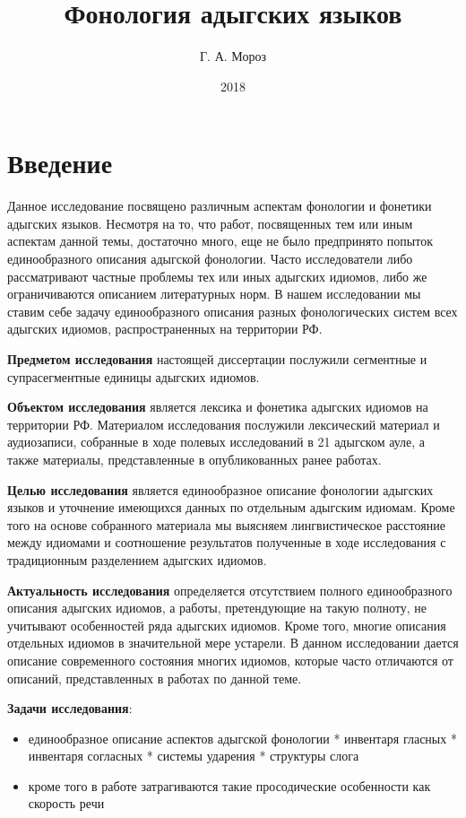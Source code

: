 \documentclass[russian,]{book}
\title{Фонология адыгских языков}
\author{Г. А. Мороз}
\date{2018}
\providecommand{\tightlist}{%
  \setlength{\itemsep}{0pt}\setlength{\parskip}{0pt}}
\begin{document}
\maketitle

{
\setcounter{tocdepth}{1}
\tableofcontents
}
\chapter{Введение}\label{intro}

Данное исследование посвящено различным аспектам фонологии и фонетики
адыгских языков. Несмотря на то, что работ, посвященных тем или иным
аспектам данной темы, достаточно много, еще не было предпринято попыток
единообразного описания адыгской фонологии. Часто исследователи либо
рассматривают частные проблемы тех или иных адыгских идиомов, либо же
ограничиваются описанием литературных норм. В нашем исследовании мы
ставим себе задачу единообразного описания разных фонологических систем
всех адыгских идиомов, распространенных на территории РФ.

\textbf{Предметом исследования} настоящей диссертации послужили
сегментные и супрасегментные единицы адыгских идиомов.

\textbf{Объектом исследования} является лексика и фонетика адыгских
идиомов на территории РФ. Материалом исследования послужили лексический
материал и аудиозаписи, собранные в ходе полевых исследований в 21
адыгском ауле, а также материалы, представленные в опубликованных ранее
работах.

\textbf{Целью исследования} является единообразное описание фонологии
адыгских языков и уточнение имеющихся данных по отдельным адыгским
идиомам. Кроме того на основе собранного материала мы выясняем
лингвистическое расстояние между идиомами и соотношение результатов
полученные в ходе исследования с традиционным разделением адыгских
идиомов.

\textbf{Актуальность исследования} определяется отсутствием полного
единообразного описания адыгских идиомов, а работы, претендующие на
такую полноту, не учитывают особенностей ряда адыгских идиомов. Кроме
того, многие описания отдельных идиомов в значительной мере устарели. В
данном исследовании дается описание современного состояния многих
идиомов, которые часто отличаются от описаний, представленных в работах
по данной теме.

\textbf{Задачи исследования}:

\begin{itemize}
\tightlist
\item
  единообразное описание аспектов адыгской фонологии * инвентаря гласных
  * инвентаря согласных * системы ударения * структуры слога
\item
  кроме того в работе затрагиваются такие просодические особенности как
  скорость речи
\end{itemize}
\end{document}
